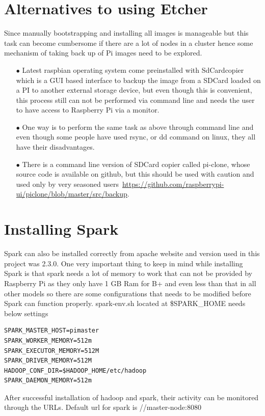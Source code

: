 \section{Alternatives to using Etcher}
Since manually bootstrapping and installing all images is manageable but this task can become cumbersome if there are a lot of nodes in a cluster hence some mechanism of taking back up of Pi images need to be explored.
\begin{itemize}
	\item[$\bullet$] Latest raspbian operating system come preinstalled with SdCardcopier which is a GUI based interface to backup the image from a SDCard loaded on a PI to another external storage device, but even though this is convenient, this process still can not be performed via command line and needs the user to have access to Raspberry Pi via a monitor.
	\item[$\bullet$] One way is to perform the same task as above through command line and even though some people have used rsync, or dd command on linux, they all have their disadvantages.
	\item[$\bullet$] There is a command line version of SDCard copier called pi-clone, whose source code is available on github, but this should be used with caution and used only by very seasoned users~\url{https://github.com/raspberrypi-ui/piclone/blob/master/src/backup}. 
\end{itemize}

\section{Installing Spark}
Spark can also be installed correctly from apache website and version used in this project was 2.3.0. One very important thing to keep in mind while installing Spark is that spark needs a lot of memory to work that can not be provided by Raspberry Pi as they only have 1 GB Ram for B+ and even less than that in all other models so there are some configurations that needs to be modified before Spark can function properly.
spark-env.sh located at \$SPARK\_HOME needs below settings
\begin{verbatim}
SPARK_MASTER_HOST=pimaster
SPARK_WORKER_MEMORY=512m
SPARK_EXECUTOR_MEMORY=512M
SPARK_DRIVER_MEMORY=512M
HADOOP_CONF_DIR=$HADOOP_HOME/etc/hadoop
SPARK_DAEMON_MEMORY=512m
\end{verbatim}

After successful installation of hadoop and spark, their activity can be monitored through the URLs.
Default url for spark is 
//master-node:8080

